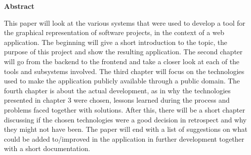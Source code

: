 \newpage

\vspace*{1cm}

\begin{center}
    \textbf{Abstract}
\end{center}

\vspace*{1cm}

\noindent
This paper will look at the various systems that were used to develop a tool for the graphical representation of software projects, in the context of a web application. The beginning will give a short introduction to the topic, the purpose of this project and show the resulting application. The second chapter will go from the backend to the frontend and take a closer look at each of the tools and subsystems involved. The third chapter will focus on the technologies used to make the application publicly available through a public domain. The fourth chapter is about the actual development, as in why the technologies presented in chapter 3 were chosen, lessons learned during the process and problems faced together with solutions. After this, there will be a short chapter discussing if the chosen technologies were a good decision in retrospect and why they might not have been. The paper will end with a list of suggestions on what could be added to/improved in the application in further development together with a short documentation.

